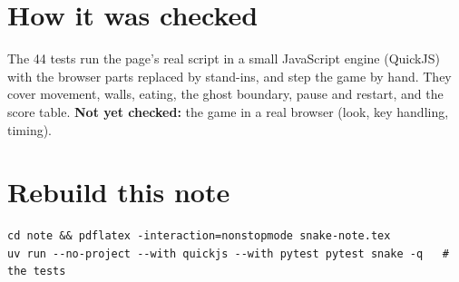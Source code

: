 \documentclass[11pt,a4paper]{article}
\begin{document}
\section*{How it was checked}
The 44 tests run the page's real script in a small JavaScript engine (QuickJS) with the browser parts replaced by stand-ins, and step the game by hand. They cover movement, walls, eating, the ghost boundary, pause and restart, and the score table.
\textbf{Not yet checked:} the game in a real browser (look, key handling, timing).

\section*{Rebuild this note}
\begin{verbatim}
cd note && pdflatex -interaction=nonstopmode snake-note.tex
uv run --no-project --with quickjs --with pytest pytest snake -q   # the tests
\end{verbatim}
\end{document}
